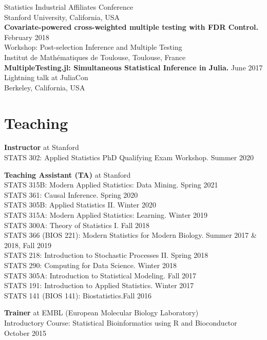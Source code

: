 \documentclass[margin,line]{res}
\newcommand{\ver}{\vspace*{-2.7mm}}
\begin{document}
\begin{resume}
Statistics Industrial Affiliates Conference\\
Stanford University, California, USA\\
\textbf{Covariate-powered cross-weighted multiple testing with FDR Control.} \hfill February 2018\\
Workshop: Post-selection Inference and Multiple Testing\\
Institut de Mathématiques de Toulouse, Toulouse, France\\
\textbf{MultipleTesting.jl: Simultaneous Statistical Inference in Julia.} \hfill June 2017\\
Lightning talk at JuliaCon\\
Berkeley, California, USA





\section{\sc Teaching}
\textbf{Instructor} at Stanford\\
STATS 302: Applied Statistics PhD Qualifying Exam Workshop. \hfill Summer 2020

\ver
\textbf{Teaching Assistant (TA)} at Stanford\\
STATS 315B: Modern Applied Statistics: Data Mining. \hfill Spring 2021\\ 
STATS 361: Causal Inference. \hfill Spring 2020\\
STATS 305B: Applied Statistics II. \hfill Winter 2020\\
STATS 315A: Modern Applied Statistics: Learning. \hfill Winter 2019\\
STATS 300A: Theory of Statistics I. \hfill Fall 2018\\
STATS 366 (BIOS 221): Modern Statistics for Modern Biology. \hfill Summer 2017 \& 2018, Fall 2019\\
STATS 218: Introduction to Stochastic Processes II. \hfill Spring 2018\\
STATS 290: Computing for Data Science. \hfill Winter 2018\\
STATS 305A: Introduction to Statistical Modeling. \hfill Fall 2017\\
STATS 191: Introduction to Applied Statistics. \hfill Winter 2017\\
STATS 141 (BIOS 141): Biostatistics.\hfill Fall 2016

\ver
\textbf{Trainer} at EMBL (European Molecular Biology Laboratory)\\
Introductory Course: Statistical Bioinformatics using R and Bioconductor \hfill October 2015





\end{resume}
\end{document}
